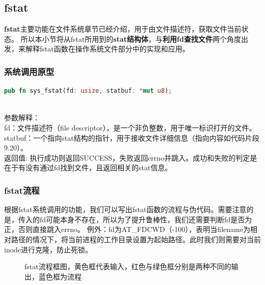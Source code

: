 
\subsection{fstat}


\textbf{fstat}主要功能在文件系统章节已经介绍，用于由文件描述符，获取文件当前状态。
所以本小节将从fstat所用到的\textbf{stat结构体}，与\textbf{利用fd查找文件}两个角度出发，来解释fstat函数在操作系统文件部分中的实现和应用。\\

\subsubsection{系统调用原型}
\begin{lstlisting}[language={Rust}, label={code:new_area},
	caption={os/src/syscall/fs.rs}]
    pub fn sys_fstat(fd: usize, statbuf: *mut u8);
\end{lstlisting}
\\
参数解释：\\
fd：文件描述符（file descriptor），是一个非负整数，用于唯一标识打开的文件。\\
statbuf：一个指向stat结构的指针，用于接收文件详细信息（指向内容如代码片段9.20）。\\
返回值: 执行成功则返回SUCCESS，失败返回errno并跳入。成功和失败的判定是在于有没有通过fd找到文件，且返回相关的stat信息。\\

\subsubsection{fstat流程}
根据fstat系统调用的功能，我们可以写出fstat函数的流程与伪代码。需要注意的是，传入的fd可能本身不存在，所以为了提升鲁棒性，我们还需要判断fd是否为正，否则直接跳入errno。
例外：fd为AT_FDCWD（-100），表明当filename为相对路径的情况下，将当前进程的工作目录设置为起始路径。此时我们则需要对当前inode进行克隆，防止死锁。
\begin{figure}[H]
    \centering
    \caption{fstat流程框图，黄色框代表输入，红色与绿色框分别是两种不同的输出，蓝色框为流程}
\end{figure}

